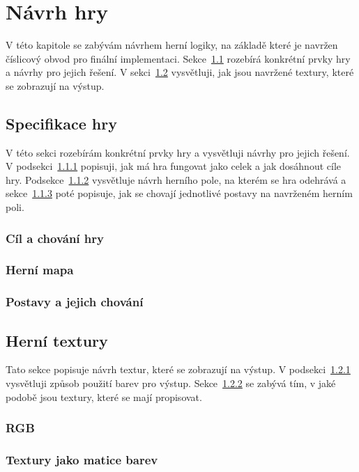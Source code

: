 \documentclass{report}
\begin{document}
\chapter{Návrh hry}
V této kapitole se zabývám návrhem herní logiky, na základě které je navržen číslicový obvod pro finální implementaci. Sekce~\ref{sec:specifikacehry} rozebírá konkrétní prvky hry a návrhy pro jejich řešení. V sekci~\ref{sec:hernitextury} vysvětluji, jak jsou navržené textury, které se zobrazují na výstup.

\section{Specifikace hry}\label{sec:specifikacehry}
V této sekci rozebírám konkrétní prvky hry a vysvětluji návrhy pro jejich řešení. V podsekci~\ref{sec:cilachovani} popisuji, jak má hra fungovat jako celek a jak dosáhnout cíle hry. Podsekce~\ref{sec:mapajakomrizka} vysvětluje návrh herního pole, na kterém se hra odehrává a sekce~\ref{sec:postavyachovani} poté popisuje, jak se chovají jednotlivé postavy na navrženém herním poli.

\subsection{Cíl a chování hry}\label{sec:cilachovani}
\subsection{Herní mapa}\label{sec:mapajakomrizka}
\subsection{Postavy a jejich chování}\label{sec:postavyachovani}

\section{Herní textury}\label{sec:hernitextury}
Tato sekce popisuje návrh textur, které se zobrazují na výstup. V podsekci~\ref{sec:RGB} vysvětluji způsob použití barev pro výstup. Sekce~\ref{sec:texturyjakomatice} se zabývá tím, v jaké podobě jsou textury, které se mají propisovat. 
\subsection{RGB}\label{sec:RGB}
\subsection{Textury jako matice barev}\label{sec:texturyjakomatice}
\end{document}
